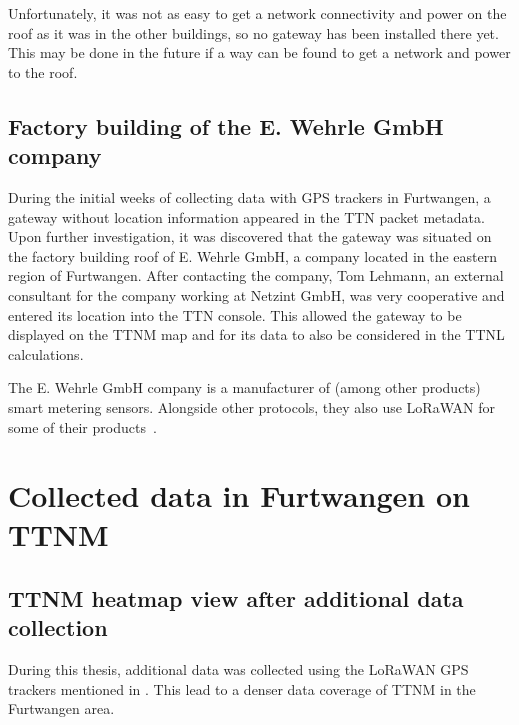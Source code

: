 Unfortunately, it was not as easy to get a network connectivity and power on the roof as it was in the other buildings, so no gateway has been installed there yet.
This may be done in the future if a way can be found to get a network and power to the roof.

\subsection{Factory building of the E. Wehrle GmbH company}\label{subsec:factory-building-of-the-e-wehrle-company}

During the initial weeks of collecting data with \ac{GPS} trackers in Furtwangen, a gateway without location information appeared in the \ac{TTN} packet metadata.
Upon further investigation, it was discovered that the gateway was situated on the factory building roof of E. Wehrle GmbH, a company located in the eastern region of Furtwangen.
After contacting the company, Tom Lehmann, an external consultant for the company working at Netzint GmbH, was very cooperative and entered its location into the \ac{TTN} console.
This allowed the gateway to be displayed on the \ac{TTNM} map and for its data to also be considered in the \ac{TTNL} calculations.

The E. Wehrle GmbH company is a manufacturer of (among other products) smart metering sensors.
Alongside other protocols, they also use \ac{LoRaWAN} for some of their products~\cite{e_wehrle_gmbh_wecount-s_nodate}.

\section{Collected data in Furtwangen on \acl{TTNM}}\label{sec:collected-data-in-furtwangen-on-ttnm}

\subsection{\acl{TTNM} heatmap view after additional data collection}\label{sec:ttm_heatmap_after}

During this thesis, additional data was collected using the \ac{LoRaWAN} \ac{GPS} trackers mentioned in .
This lead to a denser data coverage of \acl{TTNM} in the Furtwangen area.

